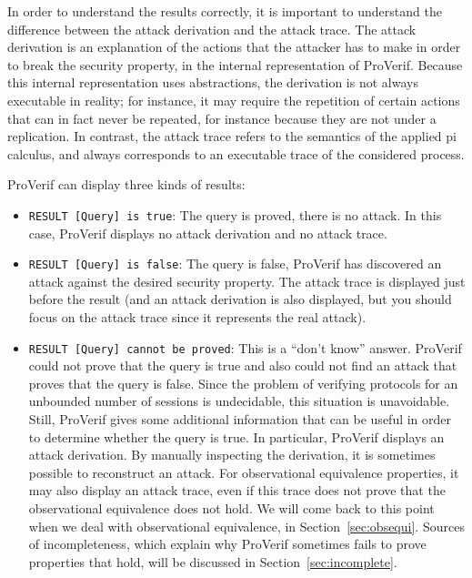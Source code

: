 \documentclass{book}
\begin{document}
In order to understand the results correctly, it is important to understand the difference between the attack derivation and the attack trace. The attack derivation is an explanation of the actions that the attacker has to make in order to break the security property, in the internal representation of ProVerif. Because this internal representation uses abstractions, the derivation is not always executable in reality; for instance, it may require the repetition of certain actions that can in fact never be repeated, for instance because they are not under a replication. In contrast, the attack trace refers to the semantics of the applied pi calculus, and always corresponds to an executable trace of the considered process.

ProVerif can display three kinds of results:
\begin{itemize}

\item \lstinline!RESULT [Query] is true!: The query is proved, there
  is no attack. In this case, ProVerif displays no attack
  derivation and no attack trace.

\item \lstinline!RESULT [Query] is false!: The query is false,
  ProVerif has discovered an attack against the desired security
  property. The attack trace is displayed just before the result
  (and an attack derivation is also displayed, but you should focus on
  the attack trace since it represents the real attack).

\item \lstinline!RESULT [Query] cannot be proved!: This is a ``don't
  know'' answer. ProVerif could not prove that the query is true and
  also could not find an attack that proves that the query is false.
  Since the problem of verifying protocols for an unbounded number of
  sessions is undecidable, this situation is unavoidable.
  Still, ProVerif gives some additional information that can be useful
  in order to determine whether the query is true. In particular,
  ProVerif displays an attack derivation. By manually inspecting the
  derivation, it is sometimes possible to reconstruct an attack.  For
  observational equivalence properties, it may also display an attack
  trace, even if this trace does not prove that the observational
  equivalence does not hold. We will come back to this point when we
  deal with observational equivalence, in Section~\ref{sec:obsequi}.
  Sources of incompleteness, which explain why ProVerif sometimes
  fails to prove properties that hold, will be discussed in
  Section~\ref{sec:incomplete}.

\end{itemize}
\end{document}

